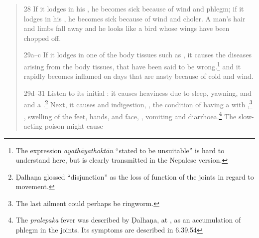 \begin{translation}
\begin{verse}



        \item[28]
        If it lodges in his , he becomes sick because of wind 
        and phlegm; if it lodges in his , he becomes sick 
        because of  wind and 
        choler.  A man's hair and limbs fall away and he looks like a
        bird whose wings have been chopped off.
        \item[29a--c]
        If it lodges in one of the body tissues such as 
        , it causes the diseases arising
        from the body tissues, that have been said to be wrong.\footnote{The 
        expression \emph{ayathāyathoktān} “stated to be unsuitable” is hard to 
        understand here, but is clearly transmitted in the Nepalese version.}
        and it rapidly becomes inflamed on days that are nasty
        because of cold and wind.
        
        \item[29d--31] Listen to its initial : it causes
heaviness due to sleep, yawning,  and
 and a .\footnote{Ḍalhaṇa  glossed “disjunction” as the
loss of function of the joints in regard to movement.} Next, it causes
 and indigestion, , the condition of having a  with
,\footnote{The last ailment could perhaps be
ringworm.} %
, swelling of the feet, hands, and
face, , vomiting and
diarrhoea.\footnote{The \emph{pralepaka} fever was described by Ḍalhaṇa,
at , as an accumulation of phlegm in the joints.  Its
symptoms are described in 6.39.54} The slow-acting poison might cause
        
        

\end{verse}
\end{translation}
